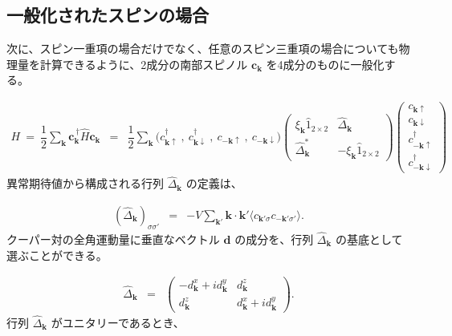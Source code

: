 \documentclass[uplatex,a4j,12pt,dvipdfmx]{jsarticle}
\begin{document}
\subsection{一般化されたスピンの場合}

次に、スピン一重項の場合だけでなく、任意のスピン三重項の場合についても物理量を計算できるように、2成分の南部スピノル $\bm{c}_{\bm{k}}$ を4成分のものに一般化する。

\begin{eqnarray}
	H
	\ = \
	\dfrac{1}{2}
	\sum_{\bm{k}}
	\bm{c}^{\ \dagger}_{\bm{k}}
	\hat{H}
	\bm{c}_{\bm{k}}
	&=&
	\dfrac{1}{2}
	\sum_{\bm{k}}
	\big( c^{\dagger}_{\bm{k} \uparrow} \ , \ c^{\dagger}_{\bm{k} \downarrow} \ , \ c_{-\bm{k} \uparrow} \ , \ c_{-\bm{k} \downarrow}  \big)
	\!\!\!
	\left(
	\begin{array}{cc}
			\xi_{\bm{k}} \hat{1}_{2 \times 2} & \hat{\Delta}_{\bm{k}}               \\[3mm]
			\hat{\Delta}^{*}_{\bm{k}}         & - \xi_{\bm{k}} \hat{1}_{2 \times 2}
		\end{array}
	\right)
	\!\!\!
	\left(
	\begin{array}{c}
			c_{\bm{k} \uparrow}            \\[2mm]
			c_{\bm{k} \downarrow}          \\[2mm]
			c^{\dagger}_{-\bm{k} \uparrow} \\[2mm]
			c^{\dagger}_{-\bm{k} \downarrow}
		\end{array}
	\right)
\end{eqnarray}
%
異常期待値から構成される行列 $\hat{\Delta}_{\bm{k}}$ の定義は、

\begin{eqnarray}
	(\hat{\Delta}_{\bm{k}})_{\sigma\sigma'}
	&=&
	-V \sum_{\bm{k}'} \bm{k} \cdot \bm{k'}
	\big\langle c_{\bm{k'} \sigma} c_{-\bm{k}' \sigma'} \big\rangle
	.
\end{eqnarray}
%
クーパー対の全角運動量に垂直なベクトル $\bm{d}$ の成分を、行列 $\hat{\Delta}_{\bm{k}}$ の基底として選ぶことができる。

\begin{eqnarray}
	\hat{\Delta}_{\bm{k}}
	&=&
	\left(
	\begin{array}{cc}
			- d^{x}_{\bm{k}} + i d^{y}_{\bm{k}} & d^{z}_{\bm{k}}                     \\[2mm]
			d^{z}_{\bm{k}}                       & d^{x}_{\bm{k}} + i d^{y}_{\bm{k}}
		\end{array}
	\right)
	.
\end{eqnarray}
%
行列 $\hat{\Delta}_{\bm{k}}$ がユニタリーであるとき、
\end{document}
